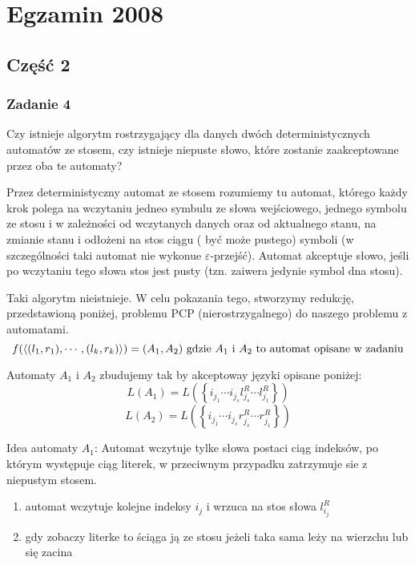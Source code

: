 \documentclass[svgnames]{report}
\begin{document}
\chapter{Egzamin 2008}
\section{Część 2}
\subsection{Zadanie 4}
\begin{framed}
Czy istnieje algorytm rostrzygający dla danych dwóch deterministycznych automatów ze stosem, czy istnieje niepuste słowo, które zostanie zaakceptowane przez oba te automaty?

Przez deterministyczny automat ze stosem rozumiemy tu automat, którego każdy krok polega na wczytaniu jedneo symbulu ze słowa wejściowego, jednego symbolu ze stosu i w zależności od wczytanych danych oraz od aktualnego stanu, na zmianie stanu i odłożeni na stos ciągu ( być może pustego) symboli (w szczególności taki automat nie wykonue $\varepsilon$-przejść). Automat akceptuje słowo, jeśli po wczytaniu tego słowa stos jest pusty (tzn. zaiwera jedynie symbol dna stosu).
\end{framed}

Taki algorytm nieistnieje.
W celu pokazania tego, stworzymy redukcję, przedstawioną poniżej, problemu PCP (nierostrzygalnego) do naszego problemu z automatami.
\begin{equation}
f(\left<(l_1, r_1), \cdots, (l_k, r_k)\right>) = (A_1, A_2) \ \hbox{gdzie $A_1$ i $A_2$ to automat opisane w zadaniu}
\end{equation}

Automaty $A_1$ i $A_2$ zbudujemy tak by akceptoway języki opisane poniżej:
\begin{equation}
L(A_1) = L(\left\{ i_{j_1} \cdots i_{j_s} l^R_{j_s} \cdots l^R_{j_1}\right\})
\end{equation}
\begin{equation}
L(A_2) = L(\left\{ i_{j_1} \cdots i_{j_s} r^R_{j_s} \cdots r^R_{j_1}\right\})
\end{equation}

Idea automaty $A_1$:
Automat wczytuje tylke słowa postaci ciąg indeksów, po którym występuje ciąg literek, w przeciwnym przypadku zatrzymuje sie z niepustym stosem.
\begin{enumerate}
	\item automat wczytuje kolejne indeksy $i_j$ i wrzuca na stos słowa $l_{i_j}^R$
	\item gdy zobaczy literke to ściąga ją ze stosu jeżeli taka sama leży na wierzchu lub się zacina
\end{enumerate}
\end{document}
